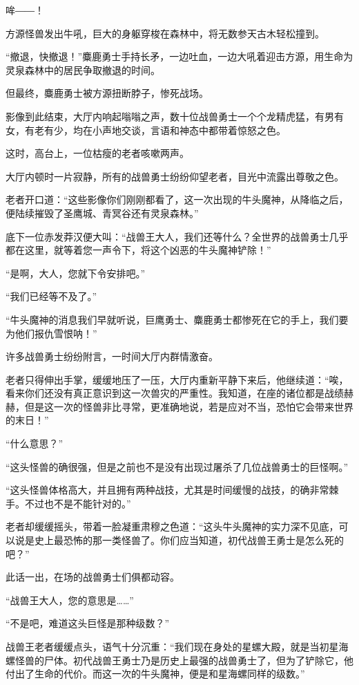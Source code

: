 
\begin{this_body}

哞――！

方源怪兽发出牛吼，巨大的身躯穿梭在森林中，将无数参天古木轻松撞到。

“撤退，快撤退！”麋鹿勇士手持长矛，一边吐血，一边大吼着迎击方源，用生命为灵泉森林中的居民争取撤退的时间。

但最终，麋鹿勇士被方源扭断脖子，惨死战场。

影像到此结束，大厅内响起嗡嗡之声，数十位战兽勇士一个个龙精虎猛，有男有女，有老有少，均在小声地交谈，言语和神态中都带着惊怒之色。

这时，高台上，一位枯瘦的老者咳嗽两声。

大厅内顿时一片寂静，所有的战兽勇士纷纷仰望老者，目光中流露出尊敬之色。

老者开口道：“这些影像你们刚刚都看了，这一次出现的牛头魔神，从降临之后，便陆续摧毁了圣鹰城、青冥谷还有灵泉森林。”

底下一位赤发莽汉便大叫：“战兽王大人，我们还等什么？全世界的战兽勇士几乎都在这里，就等着您一声令下，将这个凶恶的牛头魔神铲除！”

“是啊，大人，您就下令安排吧。”

“我们已经等不及了。”

“牛头魔神的消息我们早就听说，巨鹰勇士、麋鹿勇士都惨死在它的手上，我们要为他们报仇雪恨呐！”

许多战兽勇士纷纷附言，一时间大厅内群情激奋。

老者只得伸出手掌，缓缓地压了一压，大厅内重新平静下来后，他继续道：“唉，看来你们还没有真正意识到这一次兽灾的严重性。我知道，在座的诸位都是战绩赫赫，但是这一次的怪兽非比寻常，更准确地说，若是应对不当，恐怕它会带来世界的末日！”

“什么意思？”

“这头怪兽的确很强，但是之前也不是没有出现过屠杀了几位战兽勇士的巨怪啊。”

“这头怪兽体格高大，并且拥有两种战技，尤其是时间缓慢的战技，的确非常棘手。不过也不是不能针对的。”

老者却缓缓摇头，带着一脸凝重肃穆之色道：“这头牛头魔神的实力深不见底，可以说是史上最恐怖的那一类怪兽了。你们应当知道，初代战兽王勇士是怎么死的吧？”

此话一出，在场的战兽勇士们俱都动容。

“战兽王大人，您的意思是……”

“不是吧，难道这头巨怪是那种级数？”

战兽王老者缓缓点头，语气十分沉重：“我们现在身处的星螺大殿，就是当初星海螺怪兽的尸体。初代战兽王勇士乃是历史上最强的战兽勇士了，但为了铲除它，他付出了生命的代价。而这一次的牛头魔神，便是和星海螺同样的级数。”


\end{this_body}
